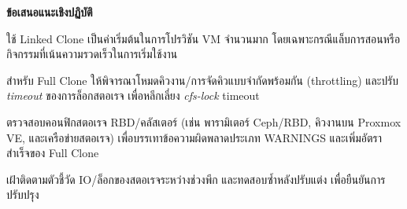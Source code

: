 \newpage
\hspace*{1.5em}
\textbf{ข้อเสนอแนะเชิงปฏิบัติ}
\begin{mycustomitem}
    \item ใช้ Linked Clone เป็นค่าเริ่มต้นในการโปรวิชัน VM จํานวนมาก โดยเฉพาะกรณีแล็บการสอนหรือกิจกรรมที่เน้นความรวดเร็วในการเริ่มใช้งาน
    \item สําหรับ Full Clone ให้พิจารณาโหมดคิวงาน/การจัดคิวแบบจํากัดพร้อมกัน (throttling) และปรับ \textit{timeout} ของการล็อกสตอเรจ เพื่อหลีกเลี่ยง \textit{cfs-lock} timeout
    \item ตรวจสอบคอนฟิกสตอเรจ RBD/คลัสเตอร์ (เช่น พารามิเตอร์ Ceph/RBD, คิวงานบน Proxmox VE, และเครือข่ายสตอเรจ) เพื่อบรรเทาข้อความผิดพลาดประเภท WARNINGS และเพิ่มอัตราสำเร็จของ Full Clone
    \item เฝ้าติดตามตัวชี้วัด IO/ล็อกของสตอเรจระหว่างช่วงพีก และทดสอบซ้ำหลังปรับแต่ง เพื่อยืนยันการปรับปรุง
\end{mycustomitem}
